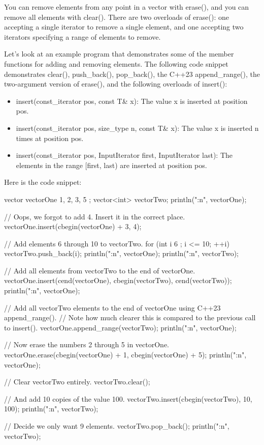 You can remove elements from any point in a vector with erase(), and you can remove all elements with clear(). There are two overloads of erase(): one accepting a single iterator to remove a single element, and one accepting two iterators specifying a range of elements to remove.

Let’s look at an example program that demonstrates some of the member functions for adding and removing elements. The following code snippet demonstrates clear(), push\_back(), pop\_back(), the C++23 append\_range(), the two-argument version of erase(), and the following overloads of insert():

\begin{itemize}
\item
insert(const\_iterator pos, const T\& x): The value x is inserted at position pos.

\item
insert(const\_iterator pos, size\_type n, const T\& x): The value x is inserted n times at position pos.

\item
insert(const\_iterator pos, InputIterator first, InputIterator last): The elements in the range [first, last) are inserted at position pos.
\end{itemize}

Here is the code snippet:

\begin{cpp}
vector vectorOne { 1, 2, 3, 5 };
vector<int> vectorTwo;
println("{:n}", vectorOne);

// Oops, we forgot to add 4. Insert it in the correct place.
vectorOne.insert(cbegin(vectorOne) + 3, 4);

// Add elements 6 through 10 to vectorTwo.
for (int i { 6 }; i <= 10; ++i) {
    vectorTwo.push_back(i);
}
println("{:n}", vectorOne);
println("{:n}", vectorTwo);

// Add all elements from vectorTwo to the end of vectorOne.
vectorOne.insert(cend(vectorOne), cbegin(vectorTwo), cend(vectorTwo));
println("{:n}", vectorOne);

// Add all vectorTwo elements to the end of vectorOne using C++23 append_range().
// Note how much clearer this is compared to the previous call to insert().
vectorOne.append_range(vectorTwo);
println("{:n}", vectorOne);

// Now erase the numbers 2 through 5 in vectorOne.
vectorOne.erase(cbegin(vectorOne) + 1, cbegin(vectorOne) + 5);
println("{:n}", vectorOne);

// Clear vectorTwo entirely.
vectorTwo.clear();

// And add 10 copies of the value 100.
vectorTwo.insert(cbegin(vectorTwo), 10, 100);
println("{:n}", vectorTwo);

// Decide we only want 9 elements.
vectorTwo.pop_back();
println("{:n}", vectorTwo);
\end{cpp}

